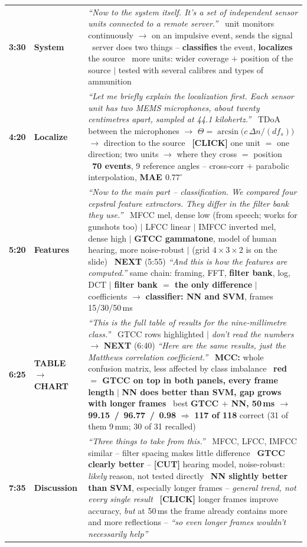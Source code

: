 \documentclass[10pt,a4paper]{article}
\newcommand{\say}[1]{\textit{\color{black!75}``#1''}}
\newcommand{\bt}{\newline\raisebox{0.15ex}{\tiny$\blacksquare$}~}
\newcommand{\cue}[3]{%
  \textbf{\color{ctublue}#1} & \textbf{#2} & #3 \\[1.5ex]}
\begin{document}
{\begin{tabular}{@{}>{\raggedright\arraybackslash}p{10mm} >{\raggedright\arraybackslash}p{19mm} >{\raggedright\arraybackslash}p{147mm}@{}}
\cue{3:30}{System}{%
  \say{Now to the system itself. It's a set of independent sensor units connected to a
  remote server.}
  \bt unit monitors continuously $\to$ on an impulsive event, sends the signal
  \bt server does two things -- \textbf{classifies} the event, \textbf{localizes} the source
  \bt more units: wider coverage $+$ position of the source $|$ tested with several
  calibres and types of ammunition}

\cue{4:20}{Localize}{%
  \say{Let me briefly explain the localization first. Each sensor unit has two MEMS
  microphones, about twenty centimetres apart, sampled at 44.1 kilohertz.}
  \bt TDoA between the microphones $\to$ $\Theta = \arcsin\!\big(c\,\Delta n / (d f_s)\big)$
  $\to$ direction to the source
  \bt \textbf{\color{accent}[CLICK]} one unit $=$ one direction; two units $\to$ where they
  cross $=$ position
  \bt \textbf{70 events}, 9 reference angles -- cross-corr $+$ parabolic interpolation,
  \textbf{MAE $0.77^\circ$}}

\cue{5:20}{Features}{%
  \say{Now to the main part -- classification. We compared four cepstral feature
  extractors. They differ in the filter bank they use.}
  \bt MFCC mel, dense low (from speech; works for gunshots too) $|$ LFCC linear $|$ IMFCC
  inverted mel, dense high $|$ \textbf{\color{accent}GTCC gammatone}, model of human hearing,
  more noise-robust $|$ (grid $4\times3\times2$ is on the slide)
  \bt \textbf{\color{accent}NEXT} (5:55) \say{And this is how the features are computed.}
  same chain: framing, FFT, \textbf{filter bank}, log, DCT $|$ \textbf{filter bank $=$ the only
  difference} $|$ coefficients $\to$ \textbf{classifier: NN and SVM}, frames 15/30/50\,ms}

\cue{6:25}{\color{accent}TABLE $\to$ CHART}{%
  \say{This is the full table of results for the nine-millimetre class.}
  \bt GTCC rows highlighted $|$ \emph{don't read the numbers} $\to$ \textbf{\color{accent}NEXT} (6:40)
  \say{Here are the same results, just the Matthews correlation coefficient.}
  \bt \textbf{MCC:} whole confusion matrix, less affected by class imbalance
  \bt \textbf{red $=$ GTCC on top in both panels, every frame length} $|$ \textbf{NN does
  better than SVM, gap grows with longer frames}
  \bt best \textbf{GTCC $+$ NN, 50\,ms $\to$ 99.15 \,/\, 96.77 \,/\, 0.98} $\Rightarrow$
  \textbf{117 of 118} correct (31 of them 9\,mm; 30 of 31 recalled)}

\cue{7:35}{Discussion}{%
  \say{Three things to take from this.}
  \bt MFCC, LFCC, IMFCC similar -- filter spacing makes little difference
  \bt \textbf{GTCC clearly better} -- \textbf{[CUT]} hearing model, noise-robust:
  \emph{likely} reason, not tested directly
  \bt \textbf{NN slightly better than SVM}, especially longer frames -- \emph{general trend,
  not every single result}
  \bt \textbf{\color{accent}[CLICK]} longer frames improve accuracy, \emph{but} at 50\,ms the
  frame already contains more and more reflections -- \say{so even longer frames wouldn't
  necessarily help}}


\end{tabular}}
\end{document}
